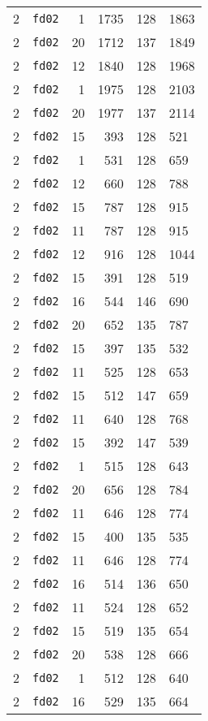 \documentclass{article}
\begin{document}
\begin{table}[h!]
\begin{tabular}{llrrrl}
    2 & \texttt{fd02} & 1 & 1735 & 128 & 1863 \\
    2 & \texttt{fd02} & 20 & 1712 & 137 & 1849 \\
    2 & \texttt{fd02} & 12 & 1840 & 128 & 1968 \\
    2 & \texttt{fd02} & 1 & 1975 & 128 & 2103 \\
    2 & \texttt{fd02} & 20 & 1977 & 137 & 2114 \\
    2 & \texttt{fd02} & 15 & 393 & 128 & 521 \\
    2 & \texttt{fd02} & 1 & 531 & 128 & 659 \\
    2 & \texttt{fd02} & 12 & 660 & 128 & 788 \\
    2 & \texttt{fd02} & 15 & 787 & 128 & 915 \\
    2 & \texttt{fd02} & 11 & 787 & 128 & 915 \\
    2 & \texttt{fd02} & 12 & 916 & 128 & 1044 \\
    2 & \texttt{fd02} & 15 & 391 & 128 & 519 \\
    2 & \texttt{fd02} & 16 & 544 & 146 & 690 \\
    2 & \texttt{fd02} & 20 & 652 & 135 & 787 \\
    2 & \texttt{fd02} & 15 & 397 & 135 & 532 \\
    2 & \texttt{fd02} & 11 & 525 & 128 & 653 \\
    2 & \texttt{fd02} & 15 & 512 & 147 & 659 \\
    2 & \texttt{fd02} & 11 & 640 & 128 & 768 \\
    2 & \texttt{fd02} & 15 & 392 & 147 & 539 \\
    2 & \texttt{fd02} & 1 & 515 & 128 & 643 \\
    2 & \texttt{fd02} & 20 & 656 & 128 & 784 \\
    2 & \texttt{fd02} & 11 & 646 & 128 & 774 \\
    2 & \texttt{fd02} & 15 & 400 & 135 & 535 \\
    2 & \texttt{fd02} & 11 & 646 & 128 & 774 \\
    2 & \texttt{fd02} & 16 & 514 & 136 & 650 \\
    2 & \texttt{fd02} & 11 & 524 & 128 & 652 \\
    2 & \texttt{fd02} & 15 & 519 & 135 & 654 \\
    2 & \texttt{fd02} & 20 & 538 & 128 & 666 \\
    2 & \texttt{fd02} & 1 & 512 & 128 & 640 \\
    2 & \texttt{fd02} & 16 & 529 & 135 & 664 \\

\end{tabular}
\end{table}
\end{document}
